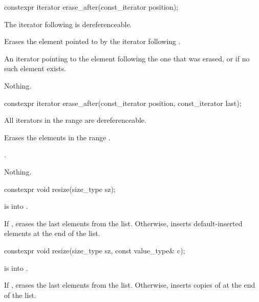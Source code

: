 %
\begin{itemdecl}
constexpr iterator erase_after(const_iterator position);
\end{itemdecl}

\begin{itemdescr}
\pnum
\expects
The iterator following  is dereferenceable.

\pnum
\effects
Erases the element pointed to by the iterator following .

\pnum
\returns
An iterator pointing to the element following the one that was
erased, or  if no such element exists.

\pnum
\throws
Nothing.
\end{itemdescr}

\begin{itemdecl}
constexpr iterator erase_after(const_iterator position, const_iterator last);
\end{itemdecl}

\begin{itemdescr}
\pnum
\expects
All iterators in the range  are dereferenceable.

\pnum
\effects
Erases the elements in the range .

\pnum
\returns
{}.

\pnum
\throws
Nothing.
\end{itemdescr}

%
\begin{itemdecl}
constexpr void resize(size_type sz);
\end{itemdecl}

\begin{itemdescr}
\pnum
\expects
{} is  into .

\pnum
\effects
If , erases the last  elements from the list. Otherwise, inserts  default-inserted
elements at the end of the list.
\end{itemdescr}

\begin{itemdecl}
constexpr void resize(size_type sz, const value_type& c);
\end{itemdecl}

\begin{itemdescr}
\pnum
\expects
{} is  into .

\pnum
\effects
If , erases the last  elements from the list. Otherwise, inserts 
copies of  at the end of the list.
\end{itemdescr}


